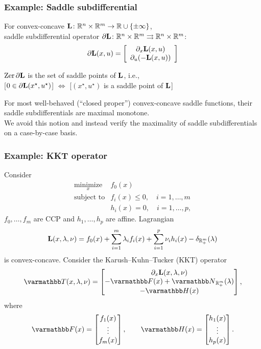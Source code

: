 \documentclass[10pt,mathserif]{beamer}
\begin{document}
\begin{frame}
\frametitle{Example: Saddle subdifferential}
For convex-concave $\mathbf{L}\colon\mathbb{R}^n \times \mathbb{R}^m \to \mathbb{R}\cup\{\pm \infty\}$,\\
saddle subdifferential operator
$\partial \mathbf{L}\colon\mathbb{R}^n \times \mathbb{R}^m\rightrightarrows\mathbb{R}^n \times \mathbb{R}^m$:
\[\partial \mathbf{L}(x,u) =
\left[ \begin{array}{c}  \partial_x \mathbf{L}(x,u) \\ \partial_u (-\mathbf{L}(x,u))
\end{array}\right]
\]
\vspace{0.2in}

$\mathrm{Zer}\,\partial \mathbf{L}$ is the set of saddle points of $\mathbf{L}$, i.e.,\\

[$0\in \partial \mathbf{L}(x^\star,u^\star)$] $\Leftrightarrow$ [$(x^\star,u^\star)$ is a saddle point of $\mathbf{L}$]

\vspace{0.2in}

For most well-behaved (``closed proper'') convex-concave saddle functions, their saddle subdifferentials are maximal monotone.\\
We avoid this notion and instead verify the maximality of saddle subdifferentials on a case-by-case basis.

\end{frame}


\begin{frame}
\frametitle{Example: KKT operator}
Consider
\[
\begin{array}{ll}
\underset{x}{\mbox{minimize}}&f_0(x)\\
\mbox{subject to}&f_i(x)\le 0,\quad i=1,\ldots,m\\
&h_i(x)=0,\quad i=1,\ldots,p,
\end{array}
\]
$f_0,\dots,f_m$ are CCP and $h_1,\dots,h_p$ are affine.
Lagrangian
\[
\mathbf{L}(x, \lambda,\nu) =f_0(x) + \sum_{i=1}^m \lambda_i f_i(x)+\sum^p_{i=1}\nu_ih_i(x)-\delta_{\mathbb{R}_+^m}(\lambda)
\]
is convex-concave. Consider the Karush--Kuhn--Tucker (KKT) operator
\[
\opT (x, \lambda,\nu) = \begin{bmatrix} \partial_x \lagrange(x, \lambda,\nu) \\ -\opF(x)+\opN_{{\reals_+^m}}(\lambda)\\-\opH(x) \end{bmatrix},
\]
where
\[
\opF(x) =  \begin{bmatrix}f_1(x) \\ \vdots \\ f_m(x)\end{bmatrix},
\qquad
\opH(x) =  \begin{bmatrix} h_1(x) \\ \vdots \\ h_p(x) \end{bmatrix}.
\]
\end{frame}
\end{document}
